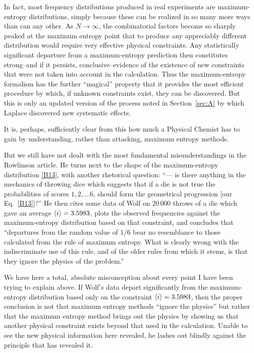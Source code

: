 In fact, most frequency distributions produced in real experiments are maximum-entropy distributions, simply because these can be realized in so many more ways than can any other.
As $N\to\infty$, the combinatorial factors become so sharply peaked at the maximum entropy point that to produce any appreciably different distribution would require very effective physical constraints.
Any statistically significant departure from a maximum-entropy prediction then constitutes strong--and if it persists, conclusive--evidence of the existence of new constraints that were not taken into account in the calculation.
Thus the maximum-entropy formalism has the further ``magical'' property that it provides the most efficient procedure by which, if unknown constraints exist, they can be discovered. But this is only an updated version of the process noted in Section~\ref{sec:A} by which Laplace discovered new systematic effects.

It is, perhaps, sufficiently clear from this how much a Physical Chemist has to gain by understanding, rather than attacking, maximum entropy methods.

But we still have not dealt with the most fundamental misunderstandings in the Rowlinson article.
He turns next to the shape of the maximum-entropy distribution \eqref{B13}, with another rhetorical question: ``--- is there anything in the mechanics of throwing dice which suggests that if a die is not true the probabilities of scores $1,2,\ldots 6$, should form the geometrical progression [our Eq.~\eqref{B13}]?''
He then cites some data of Wolf on $20\,000$ throws of a die which gave an average $\langle i\rangle= 3.5983$, plots the observed frequencies against the maximum-entropy distribution based on that constraint, and concludes that ``departures from the random value of $1/6$ bear no resemblance to those calculated from the rule of maximum entropy.
What is clearly wrong with the indiscriminate use of this rule, and of the older rules from which it stems, is that they ignore the physics of the problem.''

We have here a total, absolute misconception about every point I have been trying to explain above.
If Wolf's data depart significantly from the maximum-entropy distribution based only on the constraint $\langle i\rangle = 3.5983$, then the proper conclusion is not that maximum entropy methods ``ignore the physics'' but rather that the maximum entropy method brings out the physics by showing us that another physical constraint exists beyond that used in the calculation.
Unable to see the new physical information here revealed, he lashes out blindly against the principle that has revealed it.

